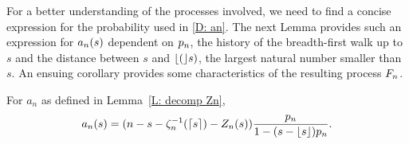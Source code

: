 For a better understanding of the processes involved, we need to find a concise expression for the probability used in \eqref{D: an}.
The next Lemma provides such an expression for $a_n(s)$ 
dependent on $p_n$, the history of the breadth-first walk up to $s$ and the distance between $s$ and $\lfloor(\rfloor s)$, 
the largest natural number smaller than $s$.
An ensuing corollary provides some characteristics of the resulting process $F_n$.

\begin{lemma} \label{L: formula an}
	For $a_n$ as defined in Lemma~\ref{L: decomp Zn},
	\begin{equation}
	a_n(s) = (n - s - \zeta^{-1}_n(\lceil s\rceil) - Z_n(s)) \frac{p_n}{1-(s-\lfloor s\rfloor)p_n} .
	\end{equation}
\end{lemma}


